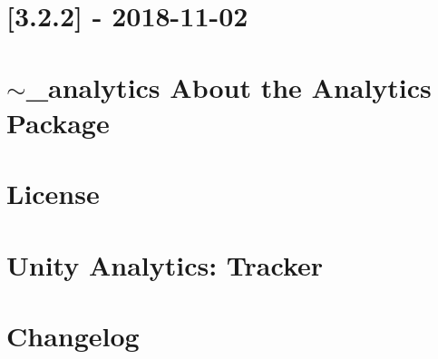 \let\mypdfximage\pdfximage\def\pdfximage{\immediate\mypdfximage}\documentclass[twoside]{book}
\newcommand{\+}{\discretionary{\mbox{\scriptsize$\hookleftarrow$}}{}{}}
\begin{document}
\chapter{\mbox{[}3.2.2\mbox{]} -\/ 2018-\/11-\/02}
\label{md__o_1__git_h_u_b_m_i_n_i_p_roject__library__package_cache_com_8unity_8analytics_0D3_82_82__c_h_a_n_g_e_l_o_g}

\chapter{$\sim$\+\_\+analytics About the Analytics Package}
\label{md__o_1__git_h_u_b_m_i_n_i_p_roject__library__package_cache_com_8unity_8analytics_0D3_82_82__documentation}

\chapter{License}
\label{md__o_1__git_h_u_b_m_i_n_i_p_roject__library__package_cache_com_8unity_8analytics_0D3_82_82__license}

\chapter{Unity Analytics\+: Tracker}
\label{md__o_1__git_h_u_b_m_i_n_i_p_roject__library__package_cache_com_8unity_8analytics_0D3_82_82__r_e_a_d_m_e}

\chapter{Changelog}
\label{md__o_1__git_h_u_b_m_i_n_i_p_roject__library__package_cache_com_8unity_8collab-proxy_0D1_82_815__c_h_a_n_g_e_l_o_g}

\end{document}
